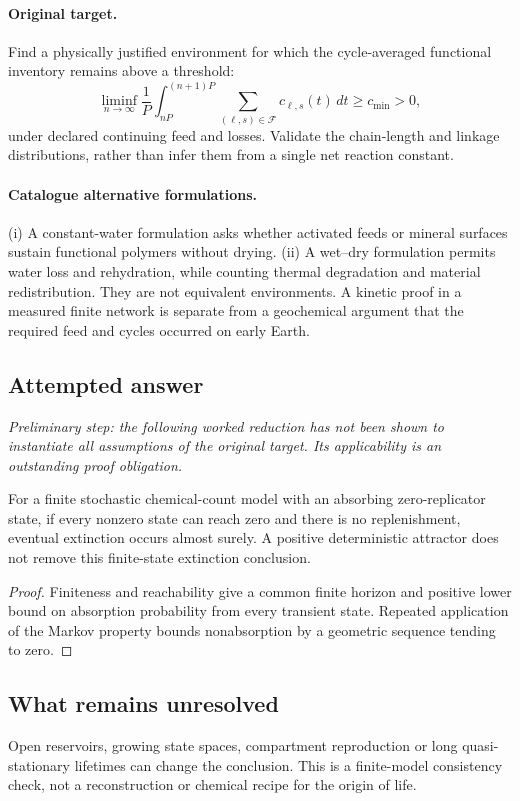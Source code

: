 \documentclass[11pt]{article}
\begin{document}
\paragraph{Original target.}
Find a physically justified environment for which the cycle-averaged functional inventory remains above a threshold:
\[
\liminf_{n\to\infty}\frac1P\int_{nP}^{(n+1)P}
\sum_{(\ell,s)\in\mathcal F}c_{\ell,s}(t)\,dt\geq c_{\min}>0,
\]
under declared continuing feed and losses. Validate the chain-length and linkage distributions, rather than infer them from a single net reaction constant.
\paragraph{Catalogue alternative formulations.}
(i) A constant-water formulation asks whether activated feeds or mineral surfaces sustain functional polymers without drying. (ii) A wet--dry formulation permits water loss and rehydration, while counting thermal degradation and material redistribution. They are not equivalent environments. A kinetic proof in a measured finite network is separate from a geochemical argument that the required feed and cycles occurred on early Earth.
\subsection{Attempted answer}
\noindent\emph{Preliminary step: the following worked reduction has not been shown to instantiate all assumptions of the original target. Its applicability is an outstanding proof obligation.}

\begin{proposition}
For a finite stochastic chemical-count model with an absorbing zero-replicator state, if every nonzero state can reach zero and there is no replenishment, eventual extinction occurs almost surely. A positive deterministic attractor does not remove this finite-state extinction conclusion.
\end{proposition}
\begin{proof}
Finiteness and reachability give a common finite horizon and positive lower bound on absorption probability from every transient state. Repeated application of the Markov property bounds nonabsorption by a geometric sequence tending to zero.
\end{proof}
\subsection{What remains unresolved}
Open reservoirs, growing state spaces, compartment reproduction or long quasi-stationary lifetimes can change the conclusion. This is a finite-model consistency check, not a reconstruction or chemical recipe for the origin of life.
\end{document}
